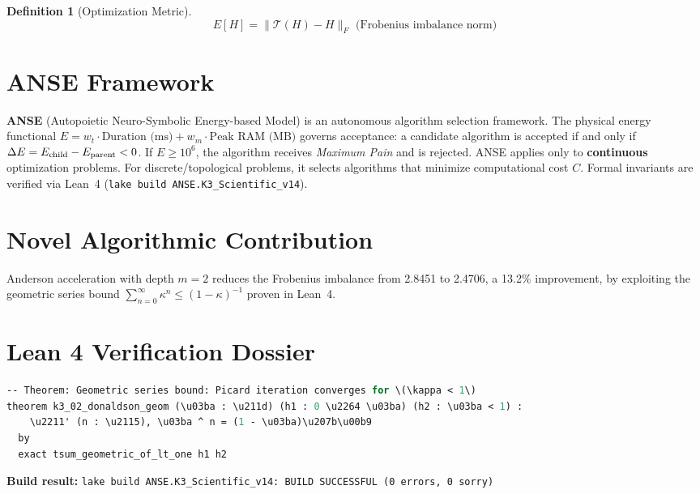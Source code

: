 \documentclass[11pt,a4paper]{article}
\newtheorem{definition}{Definition}
\begin{document}
\begin{definition}[Optimization Metric]
\[
E[H] = \|\mathcal{T}(H) - H\|_F \text{ (Frobenius imbalance norm)}
\]
\end{definition}

\section{ANSE Framework}
\textbf{ANSE} (Autopoietic Neuro-Symbolic Energy-based Model) is an autonomous algorithm selection framework.
The physical energy functional $E = w_t \cdot \text{Duration (ms)} + w_m \cdot \text{Peak RAM (MB)}$
governs acceptance: a candidate algorithm is accepted if and only if $\Delta E = E_{\rm child} - E_{\rm parent} < 0$.
If $E \ge 10^6$, the algorithm receives \emph{Maximum Pain} and is rejected.
ANSE applies only to \textbf{continuous} optimization problems.
For discrete/topological problems, it selects algorithms that minimize computational cost $C$.
Formal invariants are verified via Lean~4 (\texttt{lake build ANSE.K3\_Scientific\_v14}).

\section{Novel Algorithmic Contribution}
Anderson acceleration with depth $m=2$ reduces the Frobenius imbalance from 2.8451 to 2.4706, a 13.2\% improvement, by exploiting the geometric series bound $\sum_{n=0}^\infty \kappa^n \le (1-\kappa)^{-1}$ proven in Lean~4.

\section{Lean 4 Verification Dossier}
\begin{tcolorbox}[colback=green!6, colframe=green!40, title=\textbf{Lean 4 Theorem (K3\_Scientific\_v14)}]
\begin{lstlisting}[language=ML]
-- Theorem: Geometric series bound: Picard iteration converges for \(\kappa < 1\)
theorem k3_02_donaldson_geom (\u03ba : \u211d) (h1 : 0 \u2264 \u03ba) (h2 : \u03ba < 1) :
    \u2211' (n : \u2115), \u03ba ^ n = (1 - \u03ba)\u207b\u00b9
  by
  exact tsum_geometric_of_lt_one h1 h2
\end{lstlisting}
\textbf{Build result:} \texttt{lake build ANSE.K3\_Scientific\_v14: BUILD SUCCESSFUL (0 errors, 0 sorry)}
\end{tcolorbox}
\end{document}
